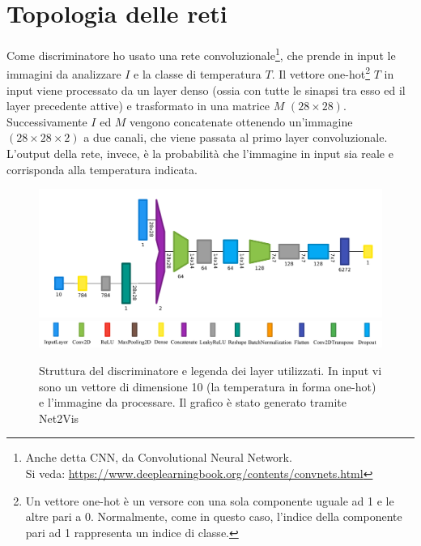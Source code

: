 \documentclass[Lau, noexaminfo, oneside]{sapthesis} %
\begin{document}
\section{Topologia delle reti}
Come discriminatore ho usato una rete convoluzionale\footnote{Anche detta CNN, da Convolutional Neural Network.\\ Si veda: \url{https://www.deeplearningbook.org/contents/convnets.html}}, che prende in input le immagini da analizzare $I$ e la classe di temperatura $T$. Il vettore one-hot\footnote{Un vettore one-hot è un versore con una sola componente uguale ad 1 e le altre pari a 0. Normalmente, come in questo caso, l'indice della componente pari ad 1 rappresenta un indice di classe.} $T$ in input viene processato da un layer denso (ossia con tutte le sinapsi tra esso ed il layer precedente attive) e trasformato in una matrice $M$ $(28\times28)$. Successivamente $I$ ed $M$ vengono concatenate ottenendo un'immagine $(28\times28\times2)$ a due canali, che viene passata al primo layer convoluzionale. L'output della rete, invece, è la probabilità che l'immagine in input sia reale e corrisponda alla temperatura indicata.
\begin{figure}[H]
\includegraphics[width=\textwidth]{dis.png}\\
\includegraphics[width=\textwidth]{legend.jpg}
\centering
\caption[...]{Struttura del discriminatore e legenda dei layer utilizzati\protect\footnotemark. In input vi sono un vettore di dimensione 10 (la temperatura in forma one-hot) e l'immagine da processare. Il grafico è stato generato tramite Net2Vis \cite{net2vis}}
\end{figure}
\end{document}
